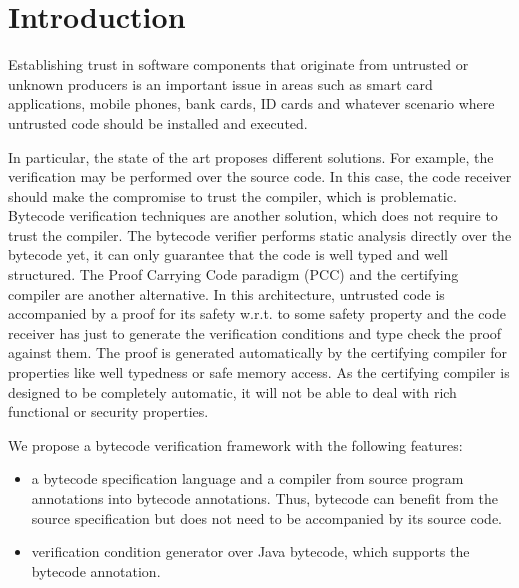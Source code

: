 \section{Introduction}\label{intro}
Establishing trust in software components that originate from untrusted or unknown producers is an important issue in areas such as
 smart card applications, mobile phones, bank cards, ID cards and whatever scenario where untrusted code should be installed and executed.

In particular, the state of the art proposes different solutions. For example,
 the verification may be performed over the source code. In this case, the code receiver should make the compromise to trust the compiler, which is problematic. Bytecode verification techniques \cite{Ljbc} are another solution, which does not require to trust the compiler. 
The bytecode verifier performs static analysis directly over the bytecode yet, it can only guarantee that 
the code is well typed and well structured. %
The Proof Carrying Code paradigm (PCC) and the certifying compiler \cite{DesNecLee98} are another alternative.
 In this architecture, untrusted code
is accompanied by a proof for its safety w.r.t. to some safety property and the code receiver has just to generate the 
verification conditions and type check the proof against them. 
The proof is generated automatically by the certifying compiler for properties like well typedness or safe memory access. 
As the certifying compiler is designed to be completely automatic, it will not be able to deal with rich functional or security properties. 
 
We propose a bytecode verification framework with the following features:
\begin{itemize}
  \item a bytecode specification language and a compiler from source program annotations into bytecode annotations.
 Thus, bytecode can benefit from the source specification but does not need to be accompanied by its source code. 

   \item verification condition generator over Java bytecode, which supports
the bytecode annotation. 
\end{itemize}


